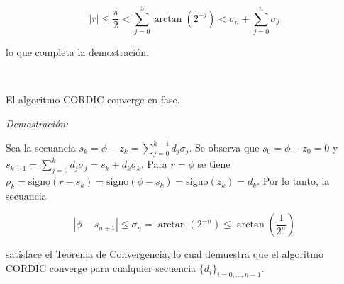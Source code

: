 \begin{equation}
|r| \le \frac{\pi}{2}<\sum_{j=0}^{3}{\arctan{\left(2^{-j}\right)}}<\sigma_n+\sum_{j=0}^{n}{\sigma_j}
\end{equation}

lo que completa la demostración.

\

\begin{teor}
El algoritmo CORDIC converge en fase.
\end{teor}

\emph{Demostración:}

Sea la secuancia $s_k=\phi-z_k=\sum_{j=0}^{k-1}{d_j\sigma_j}$. Se observa que $s_0=\phi-z_0=0$ y
$s_{k+1}=\sum_{j=0}^{k}{d_j\sigma_j}=s_k+d_k\sigma_k$. Para $r=\phi$ se tiene
$\rho_k=\mbox{signo}(r-s_k)=\mbox{signo}(\phi-s_k)=\mbox{signo}(z_k)=d_k$. Por lo tanto, la secuancia

\begin{equation}
|\phi-s_{n+1}| \le \sigma_n = \arctan{\left(2^{-n}\right)} \le \arctan{\left(\frac{1}{2^n}\right)}
\end{equation}

satisface el Teorema de Convergencia, lo cual demuestra que el algoritmo CORDIC converge para cualquier secuencia
$\{d_i\}_{i=0,\ldots,n-1}$.